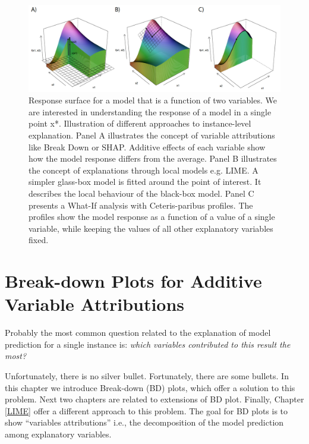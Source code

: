 \documentclass[12pt,]{krantz}
\begin{document}
\begin{figure}

{\centering \includegraphics[width=0.99\linewidth]{figure/cuts_techniki_ready} 

}

\caption{Response surface for a model that is a function of two variables. We are interested in understanding the response of a model in a single point x*. Illustration of different approaches to instance-level explanation. Panel A illustrates the concept of variable attributions like Break Down or SHAP. Additive effects of each variable show how the model response differs from the average. Panel B illustrates the concept of explanations through local models e.g. LIME. A simpler glass-box model is fitted around the point of interest. It describes the local behaviour of the black-box model. Panel C presents a What-If analysis with Ceteris-paribus profiles. The profiles show the model response as a function of a value of a single variable, while keeping the values of all other explanatory variables fixed.}\label{fig:cutsTechnikiReady}
\end{figure}

\hypertarget{breakDown}{%
\section{Break-down Plots for Additive Variable Attributions}\label{breakDown}}

Probably the most common question related to the explanation of model prediction for a single instance is: \emph{which variables contributed to this result the most?}

Unfortunately, there is no silver bullet.
Fortunately, there are some bullets.
In this chapter we introduce Break-down (BD) plots, which offer a solution to this problem. Next two chapters are related to extensions of BD plot. Finally, Chapter \ref{LIME} offer a different approach to this problem.
The goal for BD plots is to show ``variables attributions'' i.e., the decomposition of the model prediction among explanatory variables.
\end{document}
